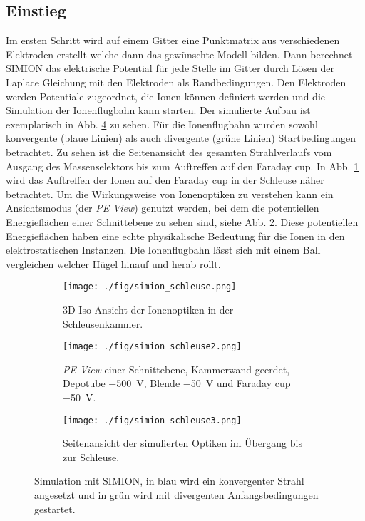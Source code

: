 \subsection{Einstieg}
Im ersten Schritt wird auf einem Gitter eine Punktmatrix aus verschiedenen Elektroden erstellt welche dann das gewünschte Modell bilden.
Dann berechnet SIMION das elektrische Potential für jede Stelle im Gitter durch Lösen der Laplace Gleichung mit den Elektroden als Randbedingungen.
Den Elektroden werden Potentiale zugeordnet, die Ionen können definiert werden und die Simulation der Ionenflugbahn kann starten.
Der simulierte Aufbau ist exemplarisch in Abb. \ref{fig:simion_schleuse} zu sehen. 
Für die Ionenflugbahn wurden sowohl konvergente (blaue Linien) als auch divergente (grüne Linien) Startbedingungen betrachtet.
Zu sehen ist die Seitenansicht des gesamten Strahlverlaufs vom Ausgang des Massenselektors bis zum Auftreffen auf den Faraday cup.
In Abb. \ref{fig:0} wird das Auftreffen der Ionen auf den Faraday cup in der Schleuse näher betrachtet.
Um die Wirkungsweise von Ionenoptiken zu verstehen kann ein Ansichtsmodus (der \textit{PE View}) genutzt werden, bei dem die potentiellen Energieflächen einer Schnittebene zu sehen sind, siehe Abb. \ref{fig:1}.
Diese potentiellen Energieflächen haben eine echte physikalische Bedeutung für die Ionen in den elektrostatischen Instanzen.
Die Ionenflugbahn lässt sich mit einem Ball vergleichen welcher Hügel hinauf und herab rollt.
\begin{figure}
  \centering
  \begin{subfigure}[h]{0.45\textwidth}
    \texttt{[image: ./fig/simion\_schleuse.png]}
    \caption{3D Iso Ansicht der Ionenoptiken in der Schleusenkammer.}
    \label{fig:0}
  \end{subfigure}\hfill
  \begin{subfigure}[h]{0.5\textwidth}
    \texttt{[image: ./fig/simion\_schleuse2.png]}
    \caption{\textit{PE View} einer Schnittebene, Kammerwand geerdet, Depotube \SI{-500}{\volt}, Blende \SI{-50}{\volt} und Faraday cup \SI{-50}{\volt}.}
    \label{fig:1}
  \end{subfigure}\hfill
  \begin{subfigure}[b]{1\textwidth}
    \texttt{[image: ./fig/simion\_schleuse3.png]}
    \caption{Seitenansicht der simulierten Optiken im Übergang bis zur Schleuse.}
    \label{fig:2}
  \end{subfigure}
  \caption{Simulation mit SIMION, in blau wird ein konvergenter Strahl angesetzt und in grün wird mit divergenten Anfangsbedingungen gestartet.}
  \label{fig:simion_schleuse}
\end{figure}

